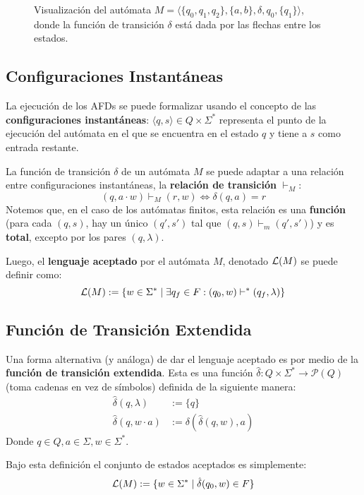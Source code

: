\begin{figure}[H]
    \centering
    \caption*{Visualización del autómata $M = \langle \{q_0, q_1, q_2\}, \{a, b\}, \delta, q_0, \{q_1\} \rangle$, donde la función de transición $\delta$ está dada por las flechas entre los estados.}
\end{figure}

\subsection{Configuraciones Instantáneas}

La ejecución de los AFDs se puede formalizar usando el concepto de las \textbf{configuraciones instantáneas}: $\langle q, s \rangle \in Q \times \Sigma^*$ representa el punto de la ejecución del autómata en el que se encuentra en el estado $q$ y tiene a $s$ como entrada restante.

La función de transición $\delta$ de un autómata $M$ se puede adaptar a una relación entre configuraciones instantáneas, la \textbf{relación de transición} $\vdash_M$:
$$
(q, a \cdot w) \vdash_M (r, w) \iff \delta(q, a) = r
$$
Notemos que, en el caso de los autómatas finitos, esta relación es una \textbf{función} (para cada $(q, s)$, hay un único $(q', s')$ tal que $(q, s) \vdash_m (q', s')$) y es \textbf{total}, excepto por los pares $(q, \lambda)$.

Luego, el \textbf{lenguaje aceptado} por el autómata $M$, denotado $\mathcal{L}(M)$ se puede definir como:
$$
\mathcal{L}(M) := \{ w \in \Sigma^* \mid \exists q_f \in F : (q_0, w) \vdash^* (q_f, \lambda) \}
$$

\subsection{Función de Transición Extendida}

Una forma alternativa (y análoga) de dar el lenguaje aceptado es por medio de la \textbf{función de transición extendida}. Esta es una función $\hat \delta : Q \times \Sigma^* \to \mathcal P (Q)$ (toma cadenas en vez de símbolos) definida de la siguiente manera:
$$
\begin{aligned}
    \hat \delta(q, \lambda) & := \{q\} \\
    \hat \delta(q, w \cdot a) & := \delta (\hat \delta (q, w), a)
\end{aligned}
$$
Donde $q \in Q, a \in \Sigma, w \in \Sigma^*$.

Bajo esta definición el conjunto de estados aceptados es simplemente:
$$
\mathcal{L} (M) := \{w \in \Sigma^* \mid \hat \delta (q_0, w) \in F \}
$$
